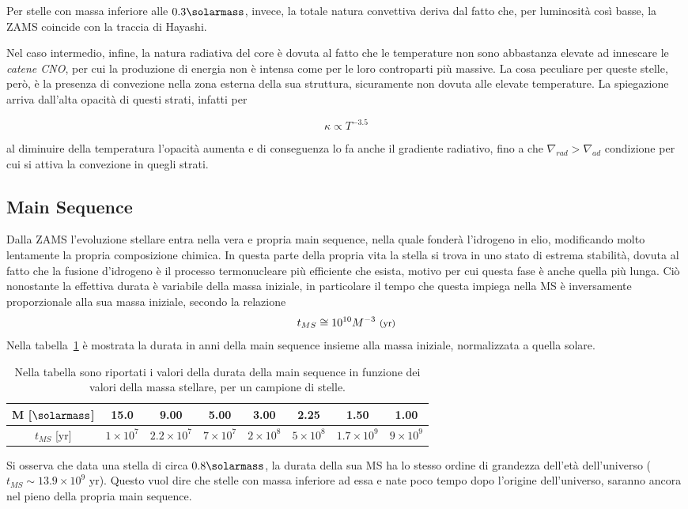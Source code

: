 Per stelle con massa inferiore alle $0.3 \si{\solarmass}$, invece, la totale natura convettiva deriva dal fatto che, per luminosità così basse, la ZAMS coincide con la traccia di Hayashi.

Nel caso intermedio, infine, la natura radiativa del core è dovuta al fatto che le temperature non sono abbastanza elevate ad innescare le \textit{catene CNO}, per cui la produzione di energia non è intensa come per le loro controparti più massive. La cosa peculiare per queste stelle, però, è la presenza di convezione nella zona esterna della sua struttura, sicuramente non dovuta alle elevate temperature. La spiegazione arriva dall'alta opacità di questi strati, infatti per

\[
    \kappa \propto T^{-3.5}
\]

al diminuire della temperatura l'opacità aumenta e di conseguenza lo fa anche il gradiente radiativo, fino a che $\nabla_{rad} > \nabla_{ad}$ condizione per cui si attiva la convezione in quegli strati.

\subsection{Main Sequence}\label{sec:main-sequence-sub}

Dalla ZAMS l'evoluzione stellare entra nella vera e propria main sequence, nella quale fonderà l'idrogeno in elio, modificando molto lentamente la propria composizione chimica. In questa parte della propria vita la stella si trova in uno stato di estrema stabilità, dovuta al fatto che la fusione d'idrogeno è il processo termonucleare più efficiente che esista, motivo per cui questa fase è anche quella più lunga. Ciò nonostante la effettiva durata è variabile della massa iniziale, in particolare il tempo che questa impiega nella MS è inversamente proporzionale alla sua massa iniziale, secondo la relazione 
\[
    t_{MS} \cong 10^{10}M^{-3}\mbox{ \footnotesize{(yr)}}
\]
Nella tabella~\ref{tab:MS} è mostrata la durata in anni della main sequence insieme alla massa iniziale, normalizzata a quella solare.
\begin{table}
    \centering
    \caption{Nella tabella sono riportati i valori della durata della main sequence in funzione dei valori della massa stellare, per un campione di stelle.}\label{tab:MS}
    \begin{tabular}{c|ccccccc}
        \toprule
        M [$\si{\solarmass}$] & 15.0 & 9.00 & 5.00 & 3.00 & 2.25 & 1.50 & 1.00\\
        \midrule
        $t_{MS}$ [yr] & $1 \times 10^7$ & $ 2.2 \times 10^7$ & $7 \times 10^7$ & $2\times 10^8$ & $5\times 10^8$ & $1.7 \times 10^9$ & $9\times 10^9$\\
        \bottomrule
    \end{tabular}
\end{table}

Si osserva che data una stella di circa $0.8 \si{\solarmass}$, la durata della sua MS ha lo stesso ordine di grandezza dell'età dell'universo ($t_{MS} \sim 13.9\times 10^9 \mbox{ yr}$). Questo vuol dire che stelle con massa inferiore ad essa e nate poco tempo dopo l'origine dell'universo, saranno ancora nel pieno della propria main sequence.
